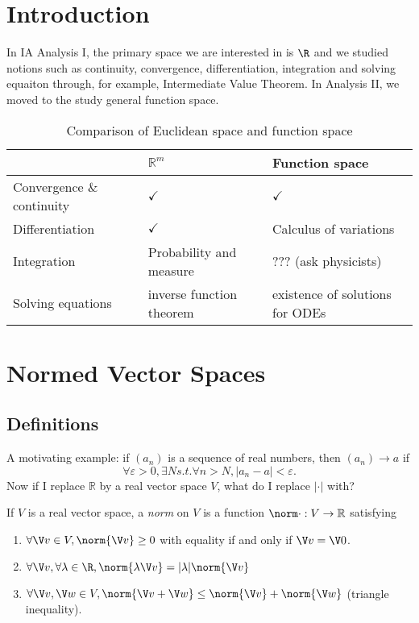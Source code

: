 \documentclass[a4paper]{article}
\theoremstyle{definition}
\begin{document}



\tableofcontents

\setcounter{section}{-1}

\section{Introduction}

In IA Analysis I, the primary space we are interested in is \(\R\) and we studied notions such as continuity, convergence, differentiation, integration and solving equaiton through, for example, Intermediate Value Theorem. In Analysis II, we moved to the study general function space.

\begin{table}[htbp]
  \centering
  \begin{tabular}{|p{}|p{}|p{}|}
    \hline
    & $\mathbb{R}^m$ & Function space \\ \hline
    Convergence \& continuity & $\checkmark$ & $\checkmark$ \\ \hline
    Differentiation & $\checkmark$ & Calculus of variations \\ \hline
    Integration & Probability and measure & ??? (ask physicists) \\ \hline
    Solving equations & inverse function theorem & existence of solutions for ODEs \\ \hline
  \end{tabular}
  \caption{Comparison of Euclidean space and function space}
\end{table}

\section{Normed Vector Spaces}

\subsection{Definitions}

A motivating example: if $(a_n)$ is a sequence of real numbers, then $(a_n)\to a$ if
\[
  \forall \varepsilon>0, \exists N s.t. \forall n>N, |a_n-a|<\varepsilon.
\]
Now if I replace $\mathbb{R}$ by a real vector space $V$, what do I replace $|\cdot|$ with?

\begin{definition}[Norm]
  If $V$ is a real vector space, a \emph{norm} on $V$ is a function $\norm \cdot:V\to\mathbb{R}$ satisfying
  \begin{enumerate}
  \item $\forall \V v \in V, \norm{\V v} \geq 0$ with equality if and only if $\V v =\V 0$.
  \item $\forall \V v, \forall \lambda \in \R, \norm{\lambda \V v} = |\lambda| \norm{\V v}$
  \item $\forall \V v, \V w\in V, \norm{\V v+\V w} \leq \norm{\V v} + \norm{\V w}$ (triangle inequality).
  \end{enumerate}
\end{definition}
\end{document}
